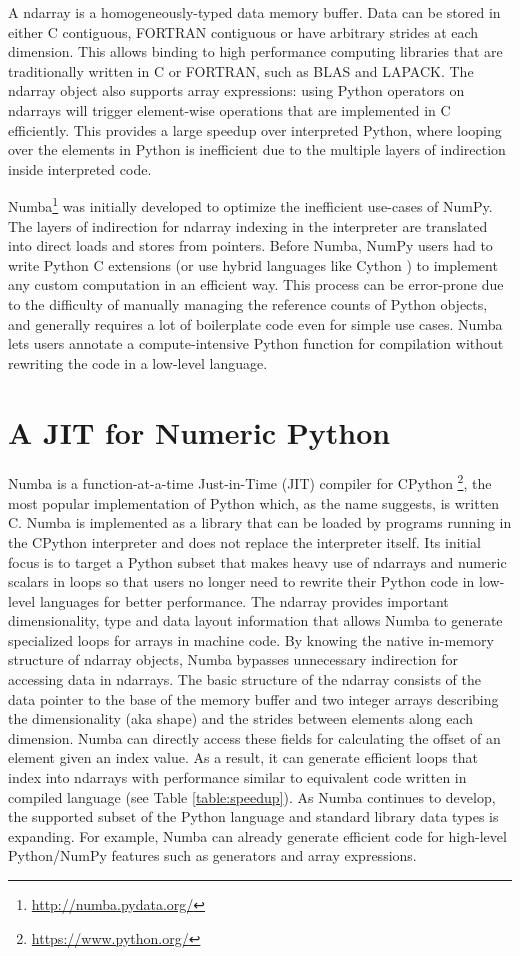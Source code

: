 \documentclass{acm_proc_article-sp}
\begin{document}
A ndarray is a homogeneously-typed data memory buffer.  Data can be
stored in either C contiguous, FORTRAN contiguous or have arbitrary
strides at each dimension.  This allows binding to high performance
computing libraries that are traditionally written in C or FORTRAN,
such as BLAS and LAPACK. The ndarray object also supports array
expressions: using Python operators on ndarrays will trigger
element-wise operations that are implemented in C efficiently.  This
provides a large speedup over interpreted Python, where looping over
the elements in Python is inefficient due to the multiple layers of
indirection inside interpreted code.

Numba\footnote{\url{http://numba.pydata.org/}} was initially
developed to optimize the inefficient use-cases of NumPy.  The layers
of indirection for ndarray indexing in the interpreter are translated
into direct loads and stores from pointers.  Before Numba, NumPy users
had to write Python C extensions (or use hybrid languages like Cython
\cite{behnel:cython}) to implement any custom computation in an
efficient way.  This process can be error-prone due to the difficulty
of manually managing the reference counts of Python objects, and
generally requires a lot of boilerplate code even for simple use
cases.  Numba lets users annotate a compute-intensive Python function
for compilation without rewriting the code in a low-level language.

\section{A JIT for Numeric Python}

Numba is a function-at-a-time Just-in-Time (JIT) compiler for CPython
\footnote{\url{https://www.python.org/}}, the most popular
implementation of Python which, as the name suggests, is written C.
Numba is implemented as a library that can be loaded by programs
running in the CPython interpreter and does not replace the interpreter
itself.  Its initial focus is to target a Python subset that makes
heavy use of ndarrays and numeric scalars in loops so that users no
longer need to rewrite their Python code in low-level languages for
better performance.  The ndarray provides important dimensionality,
type and data layout information that allows Numba to generate
specialized loops for arrays in machine code.  By knowing the native
in-memory structure of ndarray objects, Numba bypasses unnecessary
indirection for accessing data in ndarrays.  The basic structure of
the ndarray consists of the data pointer to the base of the memory
buffer and two integer arrays describing the dimensionality (aka
shape) and the strides between elements along each dimension. Numba
can directly access these fields for calculating the offset of an
element given an index value.  As a result, it can generate efficient
loops that index into ndarrays with performance similar to equivalent
code written in compiled language (see Table \ref{table:speedup}). As
Numba continues to develop, the supported subset of the Python
language and standard library data types is expanding.  For example,
Numba can already generate efficient code for high-level Python/NumPy
features such as generators and array expressions.
\end{document}
